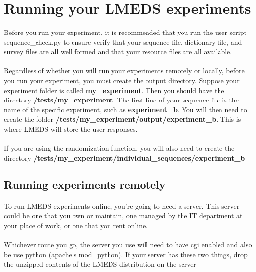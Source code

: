 
\section{Running your LMEDS experiments}

\paragraph{}
Before you run your experiment, it is recommended that you run the user script sequence\_check.py to ensure verify that your sequence file, dictionary file, and survey files are all well formed and that your resource files are all available.


\paragraph{}
Regardless of whether you will run your experiments remotely or locally, before you run your experiment, you must create the output directory.  Suppose your experiment folder is called \textbf{my\_experiment}.  Then you should have the directory \textbf{/tests/my\_experiment}.  The first line of your sequence file is the name of the specific experiment, such as \textbf{experiment\_b}.  You will then need to create the folder \textbf{/tests/my\_experiment/output/experiment\_b}.  This is where LMEDS will store the user responses.

\paragraph{}
If you are using the randomization function, you will also need to create the directory \textbf{/tests/my\_experiment/individual\_sequences/experiment\_b}


\subsection{Running experiments remotely}

\paragraph{}
To run LMEDS experiments online, you're going to need a server.  This server could be one that you own or maintain, one managed by the IT department at your place of work, or one that you rent online.

\paragraph{}
Whichever route you go, the server you use will need to have cgi enabled and also be use python (apache's mod\_python).  If your server has these two things, drop the unzipped contents of the LMEDS distribution on the server

